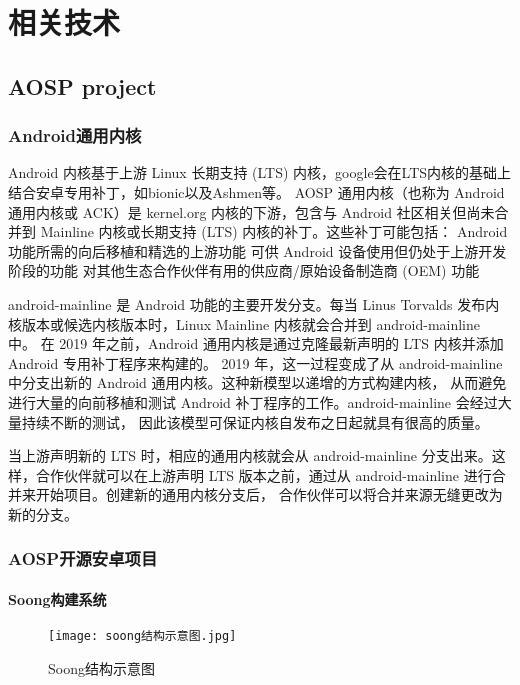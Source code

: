 
\chapter{相关技术}

\section{AOSP project}

\subsection{Android通用内核}

Android 内核基于上游 Linux 长期支持 (LTS) 内核，google会在LTS内核的基础上结合安卓专用补丁，如bionic以及Ashmen等。
AOSP 通用内核（也称为 Android 通用内核或 ACK）是 kernel.org 内核的下游，包含与 Android 社区相关但尚未合并到 Mainline 
内核或长期支持 (LTS) 内核的补丁。这些补丁可能包括：
    Android 功能所需的向后移植和精选的上游功能
    可供 Android 设备使用但仍处于上游开发阶段的功能
    对其他生态合作伙伴有用的供应商/原始设备制造商 (OEM) 功能

android-mainline 是 Android 功能的主要开发分支。每当 Linus Torvalds 
发布内核版本或候选内核版本时，Linux Mainline 内核就会合并到 android-mainline 中。
在 2019 年之前，Android 通用内核是通过克隆最新声明的 LTS 内核并添加 Android 专用补丁程序来构建的。
2019 年，这一过程变成了从 android-mainline 中分支出新的 Android 通用内核。这种新模型以递增的方式构建内核，
从而避免进行大量的向前移植和测试 Android 补丁程序的工作。android-mainline 会经过大量持续不断的测试，
因此该模型可保证内核自发布之日起就具有很高的质量。

当上游声明新的 LTS 时，相应的通用内核就会从 android-mainline 分支出来。这样，合作伙伴就可以在上游声明 
LTS 版本之前，通过从 android-mainline 进行合并来开始项目。创建新的通用内核分支后，
合作伙伴可以将合并来源无缝更改为新的分支。

\subsection{AOSP开源安卓项目}
\subsubsection{Soong构建系统}

\begin{figure}[h]
  \centering
  \texttt{[image: soong结构示意图.jpg]}
  \caption{Soong结构示意图}
\end{figure}


